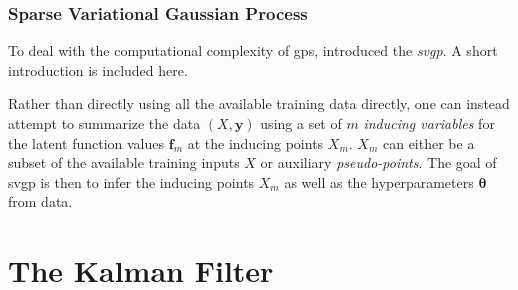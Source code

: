 


\subsubsection{Sparse Variational Gaussian Process}
To deal with the computational complexity of \acrshort{gp}s, \cite{Titsias2008VariationalMS} introduced the \textit{\acrfull{svgp}}. A short introduction is included here. 

Rather than directly using all the available training data directly, one can instead attempt to summarize the data $(X, \boldsymbol{y})$ using a set of $m$ \textit{inducing variables} for the latent function values $\boldsymbol{f}_m$ at the inducing points $X_m$. $X_m$ can either be a subset of the available training inputs $X$ or auxiliary \textit{pseudo-points}. The goal of \acrshort{svgp} is then to infer the inducing points $X_m$ as well as the hyperparameters $\boldsymbol{\theta}$ from data.


\section{The Kalman Filter}

